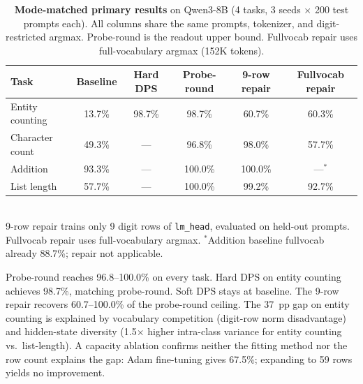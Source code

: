 \documentclass{article}
\begin{document}
\begin{table}[t]
\centering
\small
\caption{\textbf{Mode-matched primary results} on Qwen3-8B (4 tasks, 3 seeds
  $\times$ 200 test prompts each). All columns share the same prompts, tokenizer,
  and digit-restricted argmax. Probe-round is the readout upper bound.
  Fullvocab repair uses full-vocabulary argmax (152K tokens).}
\label{tab:mode_matched_extval}
\begin{tabular}{lccccc}
\toprule
Task & Baseline & Hard DPS & Probe-round & 9-row repair & Fullvocab repair \\
\midrule
Entity counting & 13.7\% & 98.7\% & 98.7\% & 60.7\% & 60.3\% \\
Character count & 49.3\% & --- & 96.8\% & 98.0\% & 57.7\% \\
Addition & 93.3\% & --- & 100.0\% & 100.0\% & ---$^\ast$ \\
List length & 57.7\% & --- & 100.0\% & 99.2\% & 92.7\% \\
\bottomrule
\end{tabular}
\\[2pt]
\footnotesize 9-row repair trains only 9 digit rows of \texttt{lm\_head},
evaluated on held-out prompts. Fullvocab repair uses full-vocabulary argmax.
$^\ast$Addition baseline fullvocab already 88.7\%; repair not applicable.
\end{table}

Probe-round reaches 96.8--100.0\% on every task. Hard DPS on entity counting
achieves 98.7\%, matching probe-round. Soft DPS stays at baseline. The 9-row
repair recovers 60.7--100.0\% of the probe-round ceiling. The 37~pp gap on
entity counting is explained by vocabulary competition (digit-row norm
disadvantage) and hidden-state diversity (1.5$\times$ higher intra-class
variance for entity counting vs.\ list-length). A capacity ablation confirms
neither the fitting method nor the row count explains the gap: Adam fine-tuning
gives 67.5\%; expanding to 59 rows yields no improvement.
\end{document}
